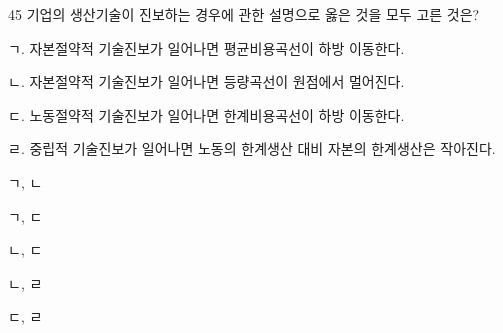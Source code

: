 \begin{question}{45}
기업의 생산기술이 진보하는 경우에 관한 설명으로 옳은 것을 모두 고른 것은?
\begin{framedtext}
ㄱ. 자본절약적 기술진보가 일어나면 평균비용곡선이 하방 이동한다. \par
ㄴ. 자본절약적 기술진보가 일어나면 등량곡선이 원점에서 멀어진다. \par
ㄷ. 노동절약적 기술진보가 일어나면 한계비용곡선이 하방 이동한다. \par
ㄹ. 중립적 기술진보가 일어나면 노동의 한계생산 대비 자본의 한계생산은 작아진다.
\end{framedtext}
\begin{choices}
  \item ㄱ, ㄴ
  \item ㄱ, ㄷ
  \item ㄴ, ㄷ
  \item ㄴ, ㄹ
  \item ㄷ, ㄹ
\end{choices}
\end{question}
